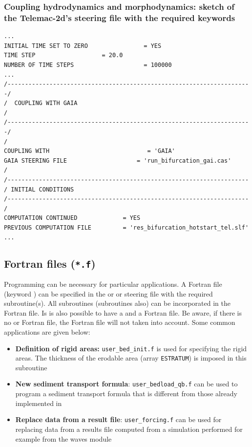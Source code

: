 \subsubsection{Coupling hydrodynamics and morphodynamics: sketch of the Telemac-2d's steering file with the required keywords}
\lstset{language=TelemacCas,
        basicstyle=\scriptsize\ttfamily}
\begin{lstlisting}[frame=trBL]
...
INITIAL TIME SET TO ZERO                = YES
TIME STEP			        = 20.0
NUMBER OF TIME STEPS                    = 100000
...
/----------------------------------------------------------------------/
/  COUPLING WITH GAIA                                                  /
/----------------------------------------------------------------------/
/
COUPLING WITH                            = 'GAIA'
GAIA STEERING FILE                    = 'run_bifurcation_gai.cas'
/
/---------------------------------------------------------------------
/ INITIAL CONDITIONS
/---------------------------------------------------------------------
/
COMPUTATION CONTINUED             = YES
PREVIOUS COMPUTATION FILE         = 'res_bifurcation_hotstart_tel.slf'
...
\end{lstlisting}
\subsection{Fortran files (\texttt{*.f})}
Programming can be necessary for particular applications. A Fortran file (keyword ) can be specified in the  or  or \gaia steering file with the required subroutine(s). All subroutines (\gaia subroutines also) can be incorporated in the \telemac{} Fortran file. Is is also possible to have a \telemac and a \gaia Fortran file. Be aware, if there is no  or  Fortran file, the \gaia Fortran file will not taken into account.
Some common applications are given below:
\begin{itemize}
\item \textbf{Definition of rigid areas:} \texttt{user\_bed\_init.f} is used for specifying the rigid areas. The thickness of the erodable area (array \texttt{ESTRATUM}) is imposed in this subroutine

\item \textbf{New sediment transport formula}: \texttt{user\_bedload\_qb.f} can be used to program a sediment transport formula that is different from those already implemented in \gaia{}

\item \textbf{Replace data from a result file}: \texttt{user\_forcing.f} can be used for replacing data from a results file computed from a simulation performed for example from the waves module \tomawac{}

\end{itemize}

